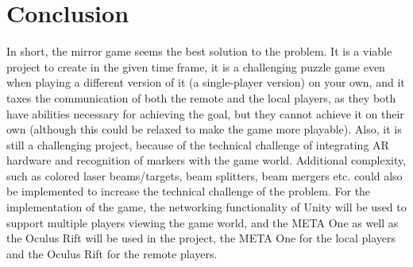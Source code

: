 \chapter{Conclusion} \label{cha:conclusion}
In short, the mirror game seems the best solution to the problem. It is a viable project
to create in the given time frame, it is a challenging puzzle game even when playing a 
different version of it (a single-player version) on your own, and it taxes the communication
of both the remote and the local players, as they both have abilities necessary for
achieving the goal, but they cannot achieve it on their own (although this could be relaxed
to make the game more playable). Also, it is still a challenging project, because of the
technical challenge of integrating AR hardware and recognition of markers with the game
world. Additional complexity, such as colored laser beams/targets, beam splitters, beam mergers
etc. could also be implemented to increase the technical challenge of the problem. For the 
implementation of the game, the networking functionality of Unity will be used to support
multiple players viewing the game world, and the META One as well as the Oculus Rift will
be used in the project, the META One for the local players and the Oculus Rift for the
remote players.
	
